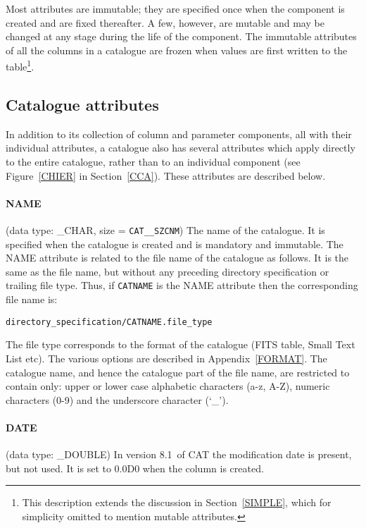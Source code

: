\documentclass[11pt,twoside]{starlink}
\providecommand{\CATversion}{8.1~}
\begin{document}
Most attributes are immutable; they are specified once when the
component is created and are fixed thereafter. A few, however, are
mutable and may be changed at any stage during the life of the
component. The immutable attributes of all the columns in a catalogue
are frozen when values are first written to the table\footnote{This
description extends the discussion in Section~\ref{SIMPLE}, which for
simplicity omitted to mention mutable attributes.}.

\subsection{Catalogue attributes}

In addition to its collection of column and parameter
components,
all with their individual attributes, a catalogue also has several
attributes which apply directly to the entire catalogue, rather than to
an individual component (see Figure~\ref{CHIER} in Section~\ref{CCA}).
These attributes are described below.

\paragraph{NAME}
(data type: \_CHAR, size = \texttt{CAT\_\_SZCNM}) The name of the
catalogue. It is specified when the catalogue is created and is
mandatory and immutable. The NAME attribute is related to the file name
of the catalogue as follows. It is the same as the file name, but
without any preceding directory specification or trailing file type.
Thus, if \texttt{CATNAME} is the NAME attribute then the corresponding
file name is:

\begin{center}
\texttt{directory\_specification/CATNAME.file\_type}
\end{center}

The file type corresponds to the format of the catalogue (FITS table,
Small Text List etc). The various options are described in
Appendix~\ref{FORMAT}.  The catalogue name, and hence the catalogue part
of the file name, are restricted to contain only: upper or lower case
alphabetic characters (a-z, A-Z), numeric characters (0-9) and the
underscore character (`\_').

\paragraph{DATE}
(data type: \_DOUBLE)
In version \CATversion of CAT the modification date is present, but
not used. It is set to 0.0D0 when the column is created.
\end{document}
